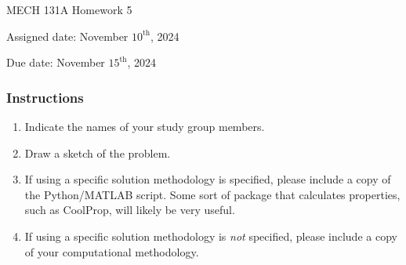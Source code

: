 \documentclass[12pt,letterpaper]{article}
\begin{document}
\noindent
MECH 131A Homework 5

\noindent
Assigned date: November $10^{\mathrm{th}}$, 2024

\noindent
Due date: November $15^{\mathrm{th}}$, 2024

\subsubsection*{Instructions}
\begin{enumerate}
	\item Indicate the names of your study group members.
	\item Draw a sketch of the problem.
	\item If using a specific solution methodology is specified, please include a copy of the Python/MATLAB script.
		Some sort of package that calculates properties, such as CoolProp, will likely be very useful. 
	\item If using a specific solution methodology is \textit{not} specified, please include a copy of your computational methodology.
\end{enumerate}
\end{document}
